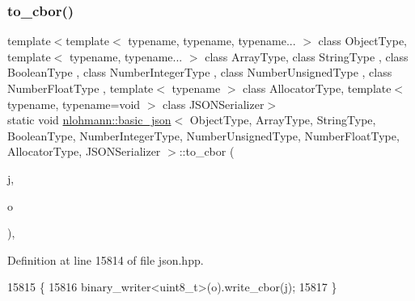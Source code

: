 \subsubsection{\texorpdfstring{to\+\_\+cbor()}{to\_cbor()}\hspace{0.1cm}{\footnotesize\ttfamily [2/3]}}
{\footnotesize\ttfamily template$<$template$<$ typename, typename, typename... $>$ class Object\+Type, template$<$ typename, typename... $>$ class Array\+Type, class String\+Type , class Boolean\+Type , class Number\+Integer\+Type , class Number\+Unsigned\+Type , class Number\+Float\+Type , template$<$ typename $>$ class Allocator\+Type, template$<$ typename, typename=void $>$ class J\+S\+O\+N\+Serializer$>$ \\
static void \hyperlink{classnlohmann_1_1basic__json}{nlohmann\+::basic\+\_\+json}$<$ Object\+Type, Array\+Type, String\+Type, Boolean\+Type, Number\+Integer\+Type, Number\+Unsigned\+Type, Number\+Float\+Type, Allocator\+Type, J\+S\+O\+N\+Serializer $>$\+::to\+\_\+cbor (\begin{DoxyParamCaption}\item[{const \hyperlink{classnlohmann_1_1basic__json}{basic\+\_\+json}$<$ Object\+Type, Array\+Type, String\+Type, Boolean\+Type, Number\+Integer\+Type, Number\+Unsigned\+Type, Number\+Float\+Type, Allocator\+Type, J\+S\+O\+N\+Serializer $>$ \&}]{j,  }\item[{\hyperlink{classnlohmann_1_1detail_1_1output__adapter}{detail\+::output\+\_\+adapter}$<$ uint8\+\_\+t $>$}]{o }\end{DoxyParamCaption})\hspace{0.3cm}{\ttfamily [inline]}, {\ttfamily [static]}}



Definition at line 15814 of file json.\+hpp.


\begin{DoxyCode}
15815     \{
15816         binary\_writer<uint8\_t>(o).write\_cbor(j);
15817     \}
\end{DoxyCode}
\mbox{\label{classnlohmann_1_1basic__json_a6defa7ec3d3ace8f713f001f720182d7}} 
